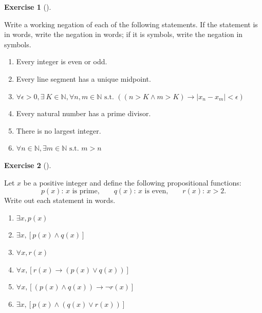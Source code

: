 \documentclass[
  letterpaper,
  10pt,
  reqno,
  twopage,
  openany]{book}
\providecommand{\tightlist}{%
  \setlength{\itemsep}{0pt}\setlength{\parskip}{0pt}}\usepackage{longtable,booktabs,array}
\theoremstyle{plain}
\theoremstyle{definition}
\newtheorem{exercise}{Exercise}[chapter]
\theoremstyle{definition}
\theoremstyle{definition}
\theoremstyle{plain}
\theoremstyle{plain}
\theoremstyle{remark}
\begin{document}
\leavevmode{}%
\begin{exercise}[]\label{exr-working-negation-in-words}

Write a working negation of each of the following statements. If the
statement is in words, write the negation in words; if it is symbols,
write the negation in symbols.

\begin{enumerate}
\def\labelenumi{\arabic{enumi}.}
\tightlist
\item
  Every integer is even or odd.
\item
  Every line segment has a unique midpoint.
\item
  \(\forall \epsilon>0, \exists \ K\in \mathbb{N}, \forall n,m\in \mathbb{N} \text{ s.t. } ((n>K \land m>K)\rightarrow |x_n -x_m|<\epsilon)\)
\item
  Every natural number has a prime divisor.
\item
  There is no largest integer.
\item
  \(\forall n\in \mathbb{N}, \exists m\in \mathbb{N} \text{ s.t. } m>n\)
\end{enumerate}

\end{exercise}

\leavevmode{}%
\begin{exercise}[]\label{exr-statement-in-words}

Let \(x\) be a positive integer and define the following propositional
functions: \[
p(x): \,  x \text{ is prime,} 
\qquad 
q(x): \, x \text{ is even,} 
\qquad
r(x): \, x>2. 
\] Write out each statement in words.

\begin{enumerate}
\def\labelenumi{\arabic{enumi}.}
\tightlist
\item
  \(\exists x, p(x)\)
\item
  \(\exists x, [p(x)\land q(x)]\)
\item
  \(\forall x, r(x)\)
\item
  \(\forall x, [r(x)\rightarrow (p(x)\lor q(x))]\)
\item
  \(\forall x, [(p(x)\land q(x))\rightarrow \neg r(x)]\)
\item
  \(\exists x, [p(x)\land (q(x)\lor r(x))]\)
\end{enumerate}

\end{exercise}
\end{document}
